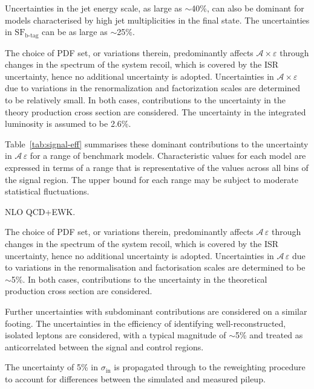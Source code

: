 Uncertainties in the jet energy scale, as large as $\sim$40\%, can
also be dominant for models characterised by high jet multiplicities
in the final state. The uncertainties in $\text{SF}_\text{b-tag}$ can
be as large as $\sim$25\%. 

The choice of PDF set, or variations therein, predominantly affects
$\mathcal{A}\times\varepsilon$ through changes in the \pt spectrum of
the system recoil, which is covered by the ISR uncertainty, hence no
additional uncertainty is adopted. Uncertainties in
$\mathcal{A}\times\varepsilon$ due to variations in the
renormalization and factorization scales are determined to be
relatively small. In both cases, contributions to the uncertainty in
the theory production cross section are considered. The uncertainty in
the integrated luminosity is assumed to be 2.6\%.

Table~\ref{tab:signal-eff} summarises these dominant contributions to
the uncertainty in $\mathcal{A}\,\varepsilon$ for a range of benchmark
models. Characteristic values for each model are expressed in terms of
a range that is representative of the values across all bins of the
signal region. The upper bound for each range may be subject to
moderate statistical fluctuations.

NLO QCD+EWK.

The choice of PDF set, or variations therein, predominantly affects
$\mathcal{A}\,\varepsilon$ through changes in the \pt spectrum of
the system recoil, which is covered by the ISR uncertainty, hence no
additional uncertainty is adopted. Uncertainties in
$\mathcal{A}\,\varepsilon$ due to variations in the
renormalisation and factorisation scales are determined to be
$\sim$5\%. In both cases, contributions to the uncertainty in the
theoretical production cross section are considered.

Further uncertainties with subdominant contributions are considered on
a similar footing. The uncertainties in the efficiency of identifying
well-reconstructed, isolated leptons are considered, with a typical
magnitude of $\sim$5\% and treated as anticorrelated between the
signal and control regions. 

The uncertainty of 5\% in $\sigma_\text{in}$ is propagated through to
the reweighting procedure to account for differences between the
simulated and measured pileup.

